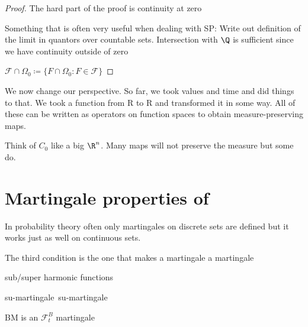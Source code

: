 \begin{prop}
\end{prop}
\begin{proof}
	The hard part of the proof is continuity at zero

	Something that is often very useful when dealing with SP:
	Write out definition of the limit in quantors over countable sets.
	Intersection with \(\Q\) is sufficient
	since we have continuity outside of zero %

	\(\mathcal F \cap \Omega_0 \coloneqq \{F \cap \Omega_0 : F \in \mathcal F\}\)
\end{proof}

We now change our perspective.
So far, we took values and time and did things to that.
We took a function from R to R and transformed it in some way.
All of these can be written as operators on function spaces
to obtain measure-preserving maps.

\begin{bem}
\end{bem}

Think of \(C_0\) like a big \(\R^n\).
Many maps will not preserve the measure but some do.

\section{Martingale properties of \BM}

In probability theory often only martingales on discrete sets are defined
but it works just as well on continuous sets.

\begin{defi}
	The third condition is the one that makes a martingale a martingale

	sub/super harmonic functions

	\def\bup{\sffamily b\hspace*{-7.6pt}\raisebox{3pt}{\(\uparrow\)}}
	\def\pdown{\sffamily p\hspace*{-7.6pt}\raisebox{-3pt}{\(\downarrow\)}}
	\def\submart{\textsf{su\rlap{\bup}\phantom{b}-martingale}}
	\def\supmart{\textsf{su\rlap{\pdown}\phantom{p}-martingale}}
	\submart\ \supmart
\end{defi}

\begin{prop}[2.10]
BM is an $\mathcal{F}_t^B$ martingale
\end{prop}

